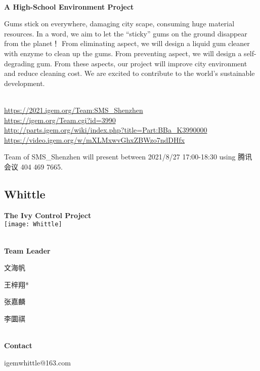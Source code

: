 \textbf{\\A High-School Environment Project\\}\begin{spacing}{1.5}

Gums stick on everywhere, damaging city scape, consuming huge material resources.
In a word, we aim to let the “sticky” gums on the ground disappear from the planet！
From eliminating aspect, we will design a liquid gum cleaner with  enzyme to clean up the gums.
From preventing aspect, we will design a self-degrading gum.
From these aspects, our project will improve city environment and reduce cleaning cost. We are excited to contribute to the world's sustainable development.\end{spacing}
\\

\url{https://2021.igem.org/Team:SMS\_Shenzhen }\\
\url{https://igem.org/Team.cgi?id=3990 }\\
\url{http://parts.igem.org/wiki/index.php?title=Part:BBa_K3990000 }\\
\url{https://video.igem.org/w/mXLMxwvGhxZBWzo7ndDHfx }\\

\vfill{}









Team of SMS\_Shenzhen will present between   2021/8/27 17:00-18:30      using 腾讯会议 404 469 7665.
\newpage


\subsection{\textcolor{Blu}{ Whittle } }
\vspace{5mm}
\begin{center}
\large{
  \textbf{ The Ivy Control Project }\\

  \texttt{[image: Whittle]}
}
\end{center}
\textbf{\\Team Leader}

  文海帆

  王梓翔*

  张嘉麟

  李圜祺


\textbf{\\Contact}

  igemwhittle@163.com


